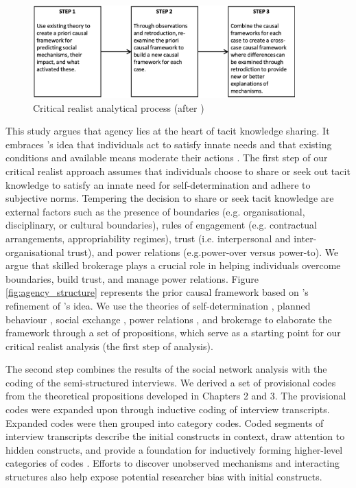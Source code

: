 \begin{figure}
\centering
\includegraphics[width = 0.9\textwidth,
height = 0.7\textheight, keepaspectratio]{Images/cr_steps.png}
\caption[Critical realist analytical process]{Critical realist analytical process (after \cite{mcavoy2018critical})}
\label{fig:cr_steps}
\end{figure}

This study argues that agency lies at the heart of tacit knowledge sharing. It embraces \citeauthor{parsons1937structure}'s \citeyearpar{parsons1937structure} idea that individuals act to satisfy innate needs and that existing conditions and available means moderate their actions \citep{loyal2001agency}. The first step of our critical realist approach assumes that individuals choose to share or seek out tacit knowledge to satisfy an innate need for self-determination and adhere to subjective norms. Tempering the decision to share or seek tacit knowledge are external factors such as the presence of boundaries (e.g. organisational, disciplinary, or cultural boundaries), rules of engagement (e.g. contractual arrangements, appropriability regimes), trust (i.e. interpersonal and inter-organisational trust), and power relations (e.g.power-over versus power-to). We argue that skilled brokerage plays a crucial role in helping individuals overcome boundaries, build trust, and manage power relations. Figure \ref{fig:agency_structure} represents the prior causal framework based on \citeauthor{loyal2001agency}'s \citeyearpar{loyal2001agency} refinement of \citeauthor{parsons1937structure}'s \citeyearpar{parsons1937structure} idea. We use the theories of self-determination \citep{ryan2000self}, planned behaviour \citep{ajzen1985intentions}, social exchange \citep{blau1964exchange}, power relations \citep{emerson1962power}, and brokerage \citep{marsden1982brokerage,burt2005brokerage,obstfeld2014brokerage} to elaborate the framework through a set of propositions, which serve as a starting point for our critical realist analysis (the first step of analysis). \medskip

The second step combines the results of the social network analysis with the coding of the semi-structured interviews. We derived a set of provisional codes from the theoretical propositions developed in Chapters 2 and 3. The provisional codes were expanded upon through inductive coding of interview transcripts. Expanded codes were then grouped into category codes. Coded segments of interview transcripts describe the initial constructs in context, draw attention to hidden constructs, and provide a foundation for inductively forming higher-level categories of codes \citep{saldana2015coding}. Efforts to discover unobserved mechanisms and interacting structures also help expose potential researcher bias with initial constructs. \medskip

